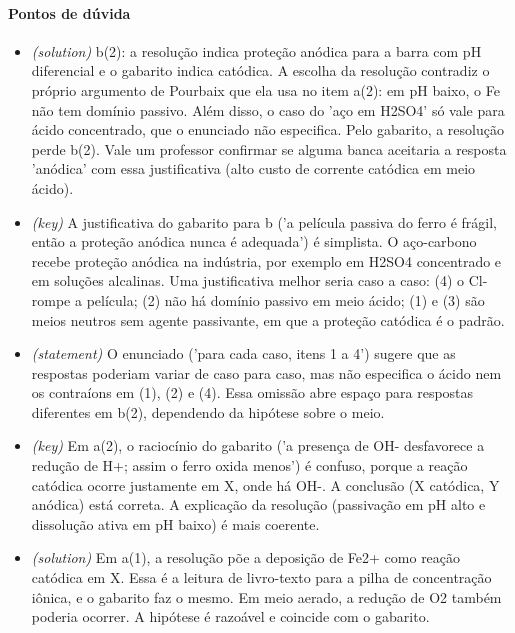 \documentclass{article}%
\begin{document}
\paragraph{Pontos de dúvida}%
\begin{itemize}%
\item%
\textit{(solution)} b(2): a resolução indica proteção anódica para a barra com pH diferencial e o gabarito indica catódica. A escolha da resolução contradiz o próprio argumento de Pourbaix que ela usa no item a(2): em pH baixo, o Fe não tem domínio passivo. Além disso, o caso do 'aço em H2SO4' só vale para ácido concentrado, que o enunciado não especifica. Pelo gabarito, a resolução perde b(2). Vale um professor confirmar se alguma banca aceitaria a resposta 'anódica' com essa justificativa (alto custo de corrente catódica em meio ácido).%
\item%
\textit{(key)} A justificativa do gabarito para b ('a película passiva do ferro é frágil, então a proteção anódica nunca é adequada') é simplista. O aço{-}carbono recebe proteção anódica na indústria, por exemplo em H2SO4 concentrado e em soluções alcalinas. Uma justificativa melhor seria caso a caso: (4) o Cl- rompe a película; (2) não há domínio passivo em meio ácido; (1) e (3) são meios neutros sem agente passivante, em que a proteção catódica é o padrão.%
\item%
\textit{(statement)} O enunciado ('para cada caso, itens 1 a 4') sugere que as respostas poderiam variar de caso para caso, mas não especifica o ácido nem os contraíons em (1), (2) e (4). Essa omissão abre espaço para respostas diferentes em b(2), dependendo da hipótese sobre o meio.%
\item%
\textit{(key)} Em a(2), o raciocínio do gabarito ('a presença de OH- desfavorece a redução de H+; assim o ferro oxida menos') é confuso, porque a reação catódica ocorre justamente em X, onde há OH-. A conclusão (X catódica, Y anódica) está correta. A explicação da resolução (passivação em pH alto e dissolução ativa em pH baixo) é mais coerente.%
\item%
\textit{(solution)} Em a(1), a resolução põe a deposição de Fe2+ como reação catódica em X. Essa é a leitura de livro{-}texto para a pilha de concentração iônica, e o gabarito faz o mesmo. Em meio aerado, a redução de O2 também poderia ocorrer. A hipótese é razoável e coincide com o gabarito.%
\end{itemize}%
\end{document}
